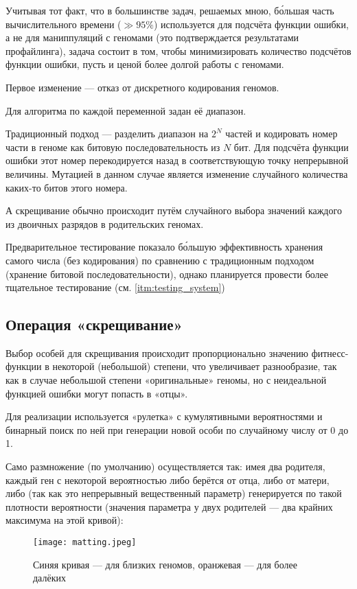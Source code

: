 Учитывая тот факт, что в большинстве задач, решаемых мною, бо́льшая часть вычислительного времени ($\gg 95\%$) используется для подсчёта функции ошибки, а не для маниппуляций с геномами
(это подтверждается результатами профайлинга),
задача состоит в том, чтобы минимизировать количество подсчётов функции ошибки, пусть и ценой более долгой работы с геномами.

Первое изменение — отказ от дискретного кодирования геномов.

Для алгоритма по каждой переменной задан её диапазон.

Традиционный подход — разделить диапазон на $2^N$ частей и кодировать номер части в геноме как битовую последовательность из $N$ бит.
Для подсчёта функции ошибки этот номер перекодируется назад в соответствующую точку непрерывной величины.
Мутацией в данном случае является изменение случайного количества каких-то битов этого номера.

А скрещивание обычно происходит путём случайного выбора значений каждого из двоичных разрядов в родительских геномах.

Предварительное тестирование показало бо́льшую эффективность хранения самого числа (без кодирования) по сравнению с традиционным подходом (хранение битовой последовательности), однако планируется провести более тщательное тестирование (см. \ref{itm:testing_system})

\subsection{Операция «скрещивание»}\label{subsec:matting}

Выбор особей для скрещивания происходит пропорционально значению фитнесс-функции в некоторой (небольшой) степени,
что увеличивает разнообразие, так как в случае небольшой степени «оригинальные» геномы, но с неидеальной функцией ошибки могут попасть в «отцы».

Для реализации используется «рулетка» с кумулятивными вероятностями и бинарный поиск по ней при генерации новой особи по случайному числу от 0 до 1.

Само размножение (по умолчанию) осуществляется так: имея два родителя, каждый ген с некоторой вероятностью
либо берётся от отца, либо от матери, либо (так как это непрерывный вещественный параметр)
генерируется по такой плотности вероятности (значения параметра у двух родителей — два крайних максимума на этой кривой):

\begin{figure}[h!]
    \centering
    \texttt{[image: matting.jpeg]}
    \caption{Синяя кривая — для близких геномов, оранжевая — для более далёких}
    \label{fig:matting-graph}
\end{figure}
\FloatBarrier


